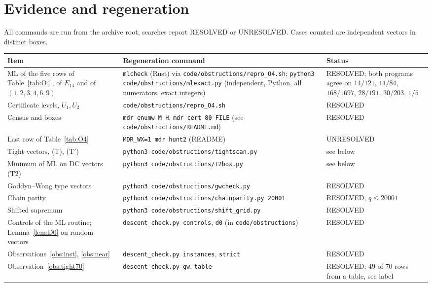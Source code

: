 \documentclass[11pt]{article}
\theoremstyle{remark}
\newcommand{\ML}{\mathrm{ML}}
\begin{document}
\section{Evidence and regeneration}\label{sec:evidence}

All commands are run from the archive root; searches report RESOLVED or UNRESOLVED. Cases counted are independent vectors in distinct boxes.

\begin{center}\footnotesize
\begin{tabular}{@{}p{3.3cm}p{5.2cm}p{2.7cm}@{}}
\toprule
Item & Regeneration command & Status\\
\midrule
$\ML$ of the five rows of Table~\ref{tab:O4}, of $E_{14}$ and of $(1,2,3,4,6,9)$ & \texttt{mlcheck} (Rust) via \texttt{code/obstructions/repro\_O4.sh}; \texttt{python3 code/obstructions/mlexact.py} (independent, Python, all numerators, exact integers) & RESOLVED; both programs agree on $14/121$, $11/84$, $168/1697$, $28/191$, $30/203$, $1/5$\\
Certificate levels, $U_1,U_2$ & \texttt{code/obstructions/repro\_O4.sh} & RESOLVED\\
Census and boxes & \texttt{mdr enumw M H}, \texttt{mdr cert 80 FILE} (see \texttt{code/obstructions/README.md}) & RESOLVED\\
Last row of Table~\ref{tab:O4} & \texttt{MDR\_WX=1 mdr hunt2} (README) & UNRESOLVED\\
Tight vectors, (T), (T$'$) & \texttt{python3 code/obstructions/tightscan.py} & see below\\
Minimum of $\ML$ on DC vectors (T2) & \texttt{python3 code/obstructions/t2box.py} & see below\\
Goddyn--Wong type vectors & \texttt{python3 code/obstructions/gwcheck.py} & RESOLVED\\
Chain parity & \texttt{python3 code/obstructions/chainparity.py 20001} & RESOLVED, $q\le20001$\\
Shifted supremum & \texttt{python3 code/obstructions/shift\_grid.py} & RESOLVED\\
Controls of the $\ML$ routine; Lemma~\ref{lem:D0} on random vectors & \texttt{descent\_check.py controls}, \texttt{d0} (in \texttt{code/obstructions}) & RESOLVED\\
Observations~\ref{obs:inst}, \ref{obs:near} & \texttt{descent\_check.py instances}, \texttt{strict} & RESOLVED\\
Observation~\ref{obs:tight70} & \texttt{descent\_check.py gw}, \texttt{table} & RESOLVED; $49$ of $70$ rows from a table, see label\\
\bottomrule
\end{tabular}
\end{center}
\end{document}
